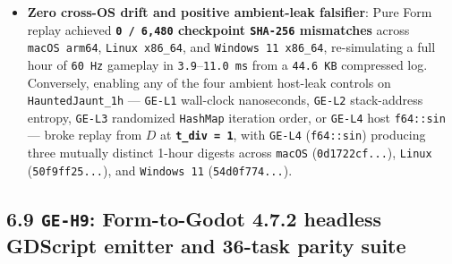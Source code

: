 \documentclass[10pt,letterpaper]{article}
\providecommand{\tightlist}{\setlength{\itemsep}{1pt}\setlength{\parskip}{0pt}}
\begin{document}
\begin{itemize}
\tightlist
\item
  \textbf{Zero cross-OS drift and positive ambient-leak falsifier}: Pure
  Form replay achieved \textbf{\texttt{0\ /\allowbreak{}\ 6,\allowbreak{}480} checkpoint
  \texttt{SHA-256} mismatches} across \texttt{macOS\ arm64},
  \texttt{Linux\ x86\_\allowbreak{}64}, and \texttt{Windows\ 11\ x86\_\allowbreak{}64},
  re-simulating a full hour of \texttt{60\ Hz} gameplay in
  \texttt{3.9}--\texttt{11.0\ ms} from a \texttt{44.6\ KB} compressed
  log. Conversely, enabling any of the four ambient host-leak controls
  on \texttt{HauntedJaunt\_\allowbreak{}1h} --- \texttt{GE-L1} wall-clock
  nanoseconds, \texttt{GE-L2} stack-address entropy, \texttt{GE-L3}
  randomized \texttt{HashMap} iteration order, or \texttt{GE-L4} host
  \texttt{f64::sin} --- broke replay from \(D\) at
  \textbf{\texttt{t\_\allowbreak{}div\ =\ 1}}, with \texttt{GE-L4}
  (\texttt{f64::sin}) producing three mutually distinct 1-hour digests
  across \texttt{macOS} (\texttt{0d1722cf.\allowbreak{}.\allowbreak{}.\allowbreak{}}), \texttt{Linux}
  (\texttt{50f9ff25.\allowbreak{}.\allowbreak{}.\allowbreak{}}), and \texttt{Windows\ 11}
  (\texttt{54d0f774.\allowbreak{}.\allowbreak{}.\allowbreak{}}).
\end{itemize}

\subsection{\texorpdfstring{6.9 \texttt{GE-H9}: Form-to-Godot 4.7.2
headless GDScript emitter and 36-task parity
suite}{6.9 GE-H9: Form-to-Godot 4.7.2 headless GDScript emitter and 36-task parity suite}}\label{ge-h9-form-to-godot-4.7.2-headless-gdscript-emitter-and-36-task-parity-suite}
\end{document}
